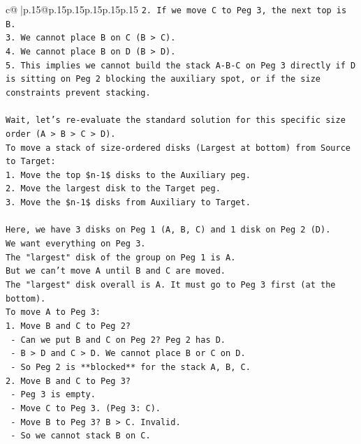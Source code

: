 \documentclass{article}
\begin{document}
{\begin{supertabular}{c@{$\;$}|p{.15\linewidth}@{}p{.15\linewidth}p{.15\linewidth}p{.15\linewidth}p{.15\linewidth}p{.15\linewidth}}
{{{\texttt{2. If we move C to Peg 3, the next top is B.} \\
\texttt{3. We cannot place B on C (B > C).} \\
\texttt{4. We cannot place B on D (B > D).} \\
\texttt{5. This implies we cannot build the stack A{-}B{-}C on Peg 3 directly if D is sitting on Peg 2 blocking the auxiliary spot, or if the size constraints prevent stacking.} \\
\\ 
\texttt{Wait, let's re{-}evaluate the standard solution for this specific size order (A > B > C > D).} \\
\texttt{To move a stack of size{-}ordered disks (Largest at bottom) from Source to Target:} \\
\texttt{1. Move the top \$n{-}1\$ disks to the Auxiliary peg.} \\
\texttt{2. Move the largest disk to the Target peg.} \\
\texttt{3. Move the \$n{-}1\$ disks from Auxiliary to Target.} \\
\\ 
\texttt{Here, we have 3 disks on Peg 1 (A, B, C) and 1 disk on Peg 2 (D).} \\
\texttt{We want everything on Peg 3.} \\
\texttt{The "largest" disk of the group on Peg 1 is A.} \\
\texttt{But we can't move A until B and C are moved.} \\
\texttt{The "largest" disk overall is A. It must go to Peg 3 first (at the bottom).} \\
\texttt{To move A to Peg 3:} \\
\texttt{1. Move B and C to Peg 2?} \\
\texttt{   {-} Can we put B and C on Peg 2? Peg 2 has D.} \\
\texttt{   {-} B > D and C > D. We cannot place B or C on D.} \\
\texttt{   {-} So Peg 2 is **blocked** for the stack A, B, C.} \\
\texttt{2. Move B and C to Peg 3?} \\
\texttt{   {-} Peg 3 is empty.} \\
\texttt{   {-} Move C to Peg 3. (Peg 3: C).} \\
\texttt{   {-} Move B to Peg 3? B > C. Invalid.} \\
\texttt{   {-} So we cannot stack B on C.} \\
\\ 
}}}
\end{supertabular}}
\end{document}
